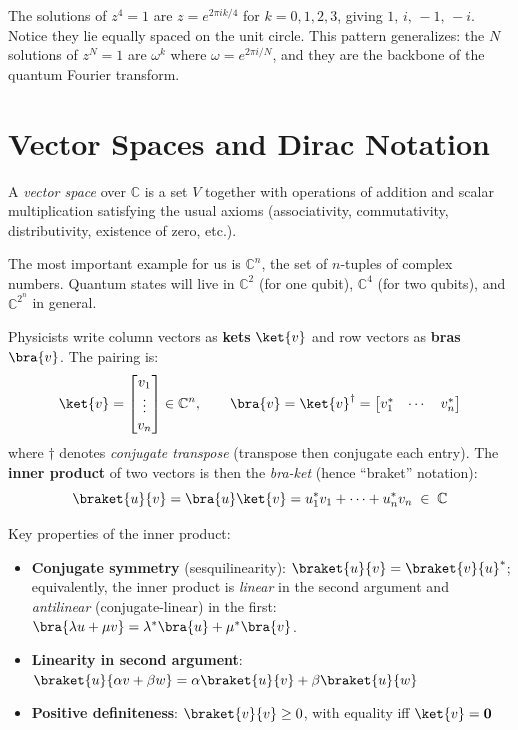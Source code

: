 \documentclass[oneside]{academica}
\begin{document}
\begin{example*}
  The solutions of $z^4=1$ are $z=e^{2\pi i k/4}$ for $k=0,1,2,3$, giving $1,\,i,\,-1,\,-i$.
  Notice they lie equally spaced on the unit circle.
  This pattern generalizes: the $N$ solutions of $z^N=1$ are $\omega^k$ where $\omega=e^{2\pi i/N}$, and they are the backbone of the quantum Fourier transform.
\end{example*}

\section{Vector Spaces and Dirac Notation}

\begin{definition*}
  A \emph{vector space} over $\mathbb{C}$ is a set $V$ together with operations of addition and scalar multiplication satisfying the usual axioms (associativity, commutativity, distributivity, existence of zero, etc.).
\end{definition*}

The most important example for us is $\mathbb{C}^n$, the set of $n$-tuples of complex numbers.
Quantum states will live in $\mathbb{C}^2$ (for one qubit), $\mathbb{C}^4$ (for two qubits), and $\mathbb{C}^{2^n}$ in general.

Physicists write column vectors as \textbf{kets} $\ket{v}$ and row vectors as \textbf{bras} $\bra{v}$.
The pairing is:
\begin{equation*}
  \ket{v} = \begin{bmatrix}v_1\\\vdots\\v_n\end{bmatrix} \in \mathbb{C}^n, \qquad
  \bra{v} = \ket{v}^\dagger = \begin{bmatrix}v_1^*&\cdots&v_n^*\end{bmatrix}
\end{equation*}
where $\dagger$ denotes \emph{conjugate transpose} (transpose then conjugate each entry).
The \textbf{inner product} of two vectors is then the \emph{bra-ket} (hence ``braket'' notation):
\begin{equation*}
  \braket{u}{v} = \bra{u}\ket{v} = u_1^*v_1+\cdots+u_n^*v_n \;\in\;\mathbb{C}
\end{equation*}

Key properties of the inner product:
\begin{itemize}
  \item \textbf{Conjugate symmetry} (sesquilinearity): $\braket{u}{v}=\braket{v}{u}^*$; equivalently, the inner product is \emph{linear} in the second argument and \emph{antilinear} (conjugate-linear) in the first: $\bra{\lambda u+\mu v} = \lambda^*\bra{u}+\mu^*\bra{v}$.
  \item \textbf{Linearity in second argument}: $\braket{u}{\alpha v+\beta w}=\alpha\braket{u}{v}+\beta\braket{u}{w}$
  \item \textbf{Positive definiteness}: $\braket{v}{v}\ge 0$, with equality iff $\ket{v}=\mathbf{0}$
\end{itemize}
\end{document}
